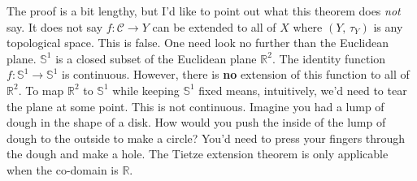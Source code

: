 \documentclass{article}
\theoremstyle{plain}
\theoremstyle{normal}
\begin{document}
        The proof is a bit lengthy, but I'd like to point out what this theorem
        does \textit{not} say. It does not say
        $f:\mathcal{C}\rightarrow{Y}$ can be extended to all of $X$ where
        $(Y,\,\tau_{Y})$ is any topological space. This is false. One need look
        no further than the Euclidean plane.
        $\mathbb{S}^{1}$ is a closed subset of the Euclidean plane
        $\mathbb{R}^{2}$. The identity function
        $f:\mathbb{S}^{1}\rightarrow\mathbb{S}^{1}$ is continuous. However,
        there is \textbf{no} extension of this function to all of
        $\mathbb{R}^{2}$. To map $\mathbb{R}^{2}$ to $\mathbb{S}^{1}$ while
        keeping $\mathbb{S}^{1}$ fixed means, intuitively, we'd need to tear the
        plane at some point. This is not continuous. Imagine you had a lump of
        dough in the shape of a disk. How would you push the inside
        of the lump of dough to the outside to make a circle? You'd need to
        press your fingers through the dough and make a hole.
        The Tietze extension theorem is only applicable when the co-domain is
        $\mathbb{R}$.
\end{document}
